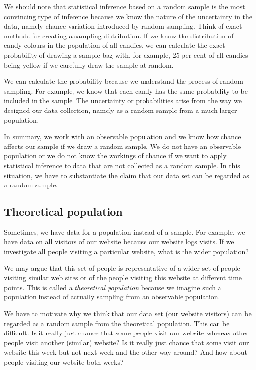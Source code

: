 \documentclass[a4paper]{book}
\theoremstyle{definition}
\theoremstyle{definition}
\theoremstyle{definition}
\theoremstyle{remark}
\begin{document}
We should note that statistical inference based on a random sample is
the most convincing type of inference because we know the nature of the
uncertainty in the data, namely chance variation introduced by random
sampling. Think of exact methods for creating a sampling distribution.
If we know the distribution of candy colours in the population of all
candies, we can calculate the exact probability of drawing a sample bag
with, for example, 25 per cent of all candies being yellow if we
carefully draw the sample at random.

We can calculate the probability because we understand the process of
random sampling. For example, we know that each candy has the same
probability to be included in the sample. The uncertainty or
probabilities arise from the way we designed our data collection, namely
as a random sample from a much larger population.

In summary, we work with an observable population and we know how chance
affects our sample if we draw a random sample. We do not have an
observable population or we do not know the workings of chance if we
want to apply statistical inference to data that are not collected as a
random sample. In this situation, we have to substantiate the claim that
our data set can be regarded as a random sample.

\subsection{Theoretical population}\label{theoretical-population}

Sometimes, we have data for a population instead of a sample. For
example, we have data on all visitors of our website because our website
logs visits. If we investigate all people visiting a particular website,
what is the wider population?

We may argue that this set of people is representative of a wider set of
people visiting similar web sites or of the people visiting this website
at different time points. This is called a \emph{theoretical population}
because we imagine such a population instead of actually sampling from
an observable population.

We have to motivate why we think that our data set (our website
visitors) can be regarded as a random sample from the theoretical
population. This can be difficult. Is it really just chance that some
people visit our website whereas other people visit another (similar)
website? Is it really just chance that some visit our website this week
but not next week and the other way around? And how about people
visiting our website both weeks?
\end{document}
